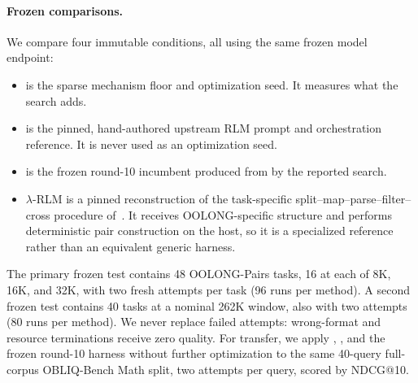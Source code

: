 \paragraph{Frozen comparisons.}
We compare four immutable conditions, all using the same frozen model endpoint:
\begin{itemize}
  \item \hzero{} is the sparse mechanism floor and optimization seed. It
  measures what the search adds.
  \item \hzerostar{} is the pinned, hand-authored upstream RLM prompt and
  orchestration reference. It is never used as an optimization seed.
  \item \shrlm{} is the frozen round-10 incumbent produced from \hzero{} by
  the reported search.
  \item $\lambda$-RLM is a pinned reconstruction of the task-specific
  split--map--parse--filter--cross procedure of~\citet{roy2026ycombinator}.
  It receives OOLONG-specific structure and performs deterministic pair
  construction on the host, so it is a specialized reference rather than an
  equivalent generic harness.
\end{itemize}

The primary frozen test contains 48 OOLONG-Pairs tasks, 16 at each of 8K, 16K,
and 32K, with two fresh attempts per task (96 runs per method). A second frozen
test contains 40 tasks at a nominal 262K window, also with two attempts (80 runs
per method). We never replace failed attempts: wrong-format and resource
terminations receive zero quality. For transfer, we apply \hzero{},
\hzerostar{}, and the frozen round-10 harness without further optimization to
the same 40-query full-corpus OBLIQ-Bench Math split, two attempts per query,
scored by NDCG@10.

